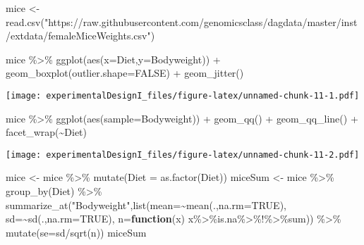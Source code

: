 \documentclass[
]{article}
\newenvironment{Shaded}{\begin{snugshade}}{\end{snugshade}}
\newcommand{\AttributeTok}[1]{\textcolor[rgb]{0.77,0.63,0.00}{#1}}
\newcommand{\ConstantTok}[1]{\textcolor[rgb]{0.00,0.00,0.00}{#1}}
\newcommand{\ControlFlowTok}[1]{\textcolor[rgb]{0.13,0.29,0.53}{\textbf{#1}}}
\newcommand{\FunctionTok}[1]{\textcolor[rgb]{0.00,0.00,0.00}{#1}}
\newcommand{\NormalTok}[1]{#1}
\newcommand{\OtherTok}[1]{\textcolor[rgb]{0.56,0.35,0.01}{#1}}
\newcommand{\SpecialCharTok}[1]{\textcolor[rgb]{0.00,0.00,0.00}{#1}}
\newcommand{\StringTok}[1]{\textcolor[rgb]{0.31,0.60,0.02}{#1}}
\begin{document}
\begin{Shaded}
\begin{Highlighting}[]
\NormalTok{mice }\OtherTok{\textless{}{-}} \FunctionTok{read.csv}\NormalTok{(}\StringTok{"https://raw.githubusercontent.com/genomicsclass/dagdata/master/inst/extdata/femaleMiceWeights.csv"}\NormalTok{)}

\NormalTok{mice }\SpecialCharTok{\%\textgreater{}\%} 
  \FunctionTok{ggplot}\NormalTok{(}\FunctionTok{aes}\NormalTok{(}\AttributeTok{x=}\NormalTok{Diet,}\AttributeTok{y=}\NormalTok{Bodyweight)) }\SpecialCharTok{+}
  \FunctionTok{geom\_boxplot}\NormalTok{(}\AttributeTok{outlier.shape=}\ConstantTok{FALSE}\NormalTok{) }\SpecialCharTok{+}
  \FunctionTok{geom\_jitter}\NormalTok{()}
\end{Highlighting}
\end{Shaded}

\texttt{[image: experimentalDesignI\_files/figure-latex/unnamed-chunk-11-1.pdf]}

\begin{Shaded}
\begin{Highlighting}[]
\NormalTok{mice }\SpecialCharTok{\%\textgreater{}\%} 
  \FunctionTok{ggplot}\NormalTok{(}\FunctionTok{aes}\NormalTok{(}\AttributeTok{sample=}\NormalTok{Bodyweight)) }\SpecialCharTok{+}
  \FunctionTok{geom\_qq}\NormalTok{() }\SpecialCharTok{+} 
  \FunctionTok{geom\_qq\_line}\NormalTok{() }\SpecialCharTok{+}
  \FunctionTok{facet\_wrap}\NormalTok{(}\SpecialCharTok{\textasciitilde{}}\NormalTok{Diet)}
\end{Highlighting}
\end{Shaded}

\texttt{[image: experimentalDesignI\_files/figure-latex/unnamed-chunk-11-2.pdf]}

\begin{Shaded}
\begin{Highlighting}[]
\NormalTok{mice }\OtherTok{\textless{}{-}}\NormalTok{ mice }\SpecialCharTok{\%\textgreater{}\%} \FunctionTok{mutate}\NormalTok{(}\AttributeTok{Diet =} \FunctionTok{as.factor}\NormalTok{(Diet))}
\NormalTok{miceSum }\OtherTok{\textless{}{-}}\NormalTok{ mice }\SpecialCharTok{\%\textgreater{}\%} 
  \FunctionTok{group\_by}\NormalTok{(Diet)  }\SpecialCharTok{\%\textgreater{}\%}
  \FunctionTok{summarize\_at}\NormalTok{(}\StringTok{"Bodyweight"}\NormalTok{,}\FunctionTok{list}\NormalTok{(}\AttributeTok{mean=}\SpecialCharTok{\textasciitilde{}}\FunctionTok{mean}\NormalTok{(.,}\AttributeTok{na.rm=}\ConstantTok{TRUE}\NormalTok{),}
                    \AttributeTok{sd=}\SpecialCharTok{\textasciitilde{}}\FunctionTok{sd}\NormalTok{(.,}\AttributeTok{na.rm=}\ConstantTok{TRUE}\NormalTok{),}
                    \AttributeTok{n=}\ControlFlowTok{function}\NormalTok{(x) x}\SpecialCharTok{\%\textgreater{}\%}\NormalTok{is.na}\SpecialCharTok{\%\textgreater{}\%}\StringTok{\textasciigrave{}}\AttributeTok{!}\StringTok{\textasciigrave{}}\SpecialCharTok{\%\textgreater{}\%}\NormalTok{sum)) }\SpecialCharTok{\%\textgreater{}\%}
  \FunctionTok{mutate}\NormalTok{(}\AttributeTok{se=}\NormalTok{sd}\SpecialCharTok{/}\FunctionTok{sqrt}\NormalTok{(n))}
\NormalTok{miceSum }
\end{Highlighting}
\end{Shaded}
\end{document}
